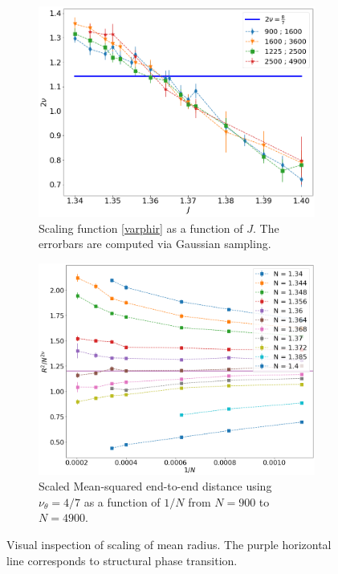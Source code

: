 \begin{figure}[!ht]
	\centering
	\captionsetup{justification=centering}
	\begin{subfigure}[b]{0.45\textwidth}
		\includegraphics[width=\textwidth]{Images/nucross_longchains.png}
		\caption{ Scaling function \eqref{varphir} as a function of $J$. The errorbars are computed via Gaussian sampling. }
		\label{fig:Rscaled_wide}
	\end{subfigure}
	\begin{subfigure}[b]{0.45\textwidth}
		\includegraphics[width=\textwidth]{Images/rscaling_longchainscross.png}
		\caption{Scaled Mean-squared end-to-end distance using $\nu_{\theta}=4/7$ as a function of $1/N$ from $N=900$ to $N=4900$.}
		\label{fig:Rscaled_narrow}
	\end{subfigure}
	\caption{ Visual inspection of scaling of mean radius.  The  purple horizontal line corresponds to structural phase transition.  
	}
	\label{fig:Rscaled}
\end{figure}


